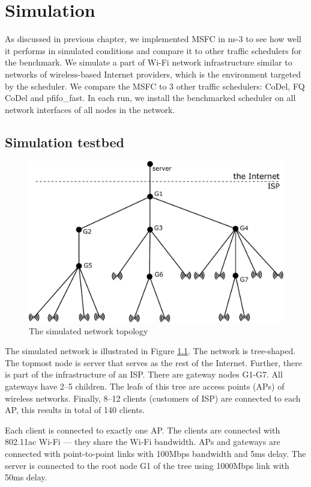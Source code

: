 \chapter{Simulation}
\label{chap3}

As discussed in previous chapter, we implemented MSFC in ns-3 to see how well it performs in simulated conditions and compare it to other traffic schedulers for the benchmark. We simulate a part of Wi-Fi network infrastructure similar to networks of wireless-based Internet providers, which is the environment targeted by the scheduler. We compare the MSFC to 3 other traffic schedulers: CoDel, FQ CoDel and pfifo\_fast. In each run, we install the benchmarked scheduler on all network interfaces of all nodes in the network.


\section{Simulation testbed}
\label{testbed}
\begin{figure}
	\centering
	\includegraphics[width=137mm]{drawings/layout}
	\caption{The simulated network topology}
	\label{fig11:sim_layout}
\end{figure}


The simulated network is illustrated in Figure \ref{fig11:sim_layout}. The network is tree-shaped. The topmost node is server that serves as the rest of the Internet. Further, there is part of the infrastructure of an ISP. There are gateway nodes G1-G7. All gateways have 2--5 children. The leafs of this tree are access points (APs) of wireless networks. Finally, 8--12 clients (customers of ISP) are connected to each AP, this results in total of 140 clients.

Each client is connected to exactly one AP. The clients are connected with 802.11ac Wi-Fi --- they share the Wi-Fi bandwidth. APs and gateways are connected with point-to-point links with 100Mbps bandwidth and 5ms delay. The server is connected to the root node G1 of the tree using 1000Mbps link with 50ms delay.

